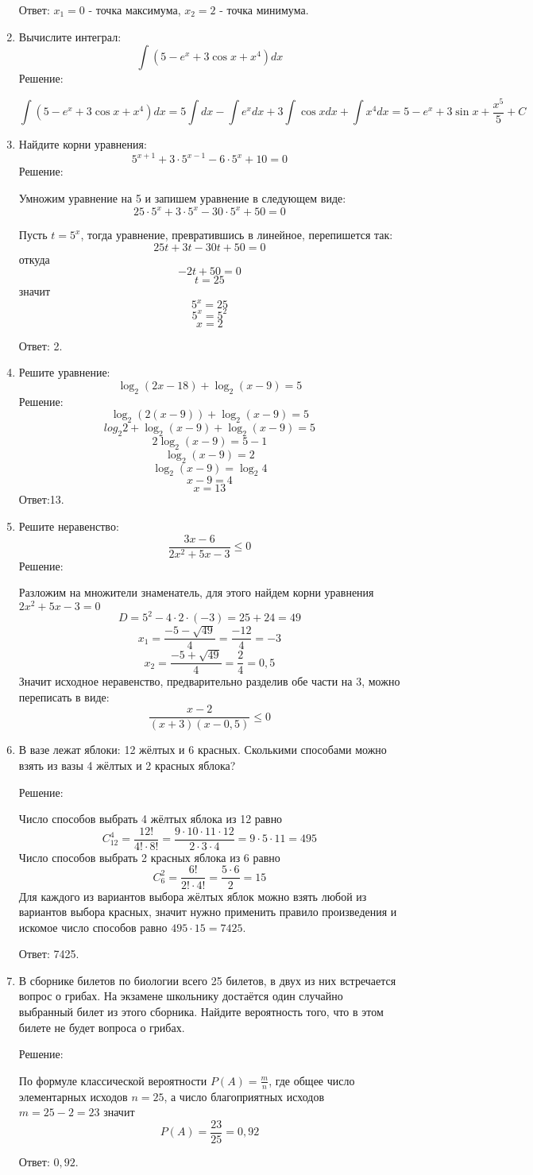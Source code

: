 \documentclass{article}
\renewcommand{\le}{\ensuremath{\leqslant}}
\begin{document}
\begin{enumerate}
Ответ: $x_1=0$ - точка максимума, $x_2=2$ - точка минимума.

\item %
Вычислите интеграл:
$$\int{\left(5-e^x+3\cos{x}+x^4\right)dx}$$
Решение:

$$\int{\left(5-e^x+3\cos{x}+x^4\right)dx}=5\int{dx}-\int{e^x dx}+3\int{\cos{x}dx}+\int{x^4dx}=5-e^x+3\sin{x}+\frac{x^5}{5}+C$$

\item %
Найдите корни уравнения:
$$5^{x+1}+3\cdot5^{x-1}-6\cdot5^x+10=0$$
Решение:

Умножим уравнение на 5 и запишем уравнение в следующем виде: $$25\cdot5^x+3\cdot5^x-30\cdot5^x+50=0$$

Пусть $t=5^x$, тогда уравнение, превратившись в линейное, перепишется так: $$25t+3t-30t+50=0$$ откуда $$-2t+50=0$$ $$t=25$$ значит $$5^x=25$$ $$5^x=5^2$$ $$x=2$$

Ответ: 2.

\item %
Решите уравнение:
$$\log_2{(2x-18)}+\log_2{(x-9)}=5$$
Решение:
$$\log_2{(2(x-9))}+\log_2{(x-9)}=5$$
$$log_2{2}+\log_2{(x-9)}+\log_2{(x-9)}=5$$
$$2\log_2{(x-9)}=5-1$$
$$\log_2{(x-9)}=2$$
$$\log_2{(x-9)}=\log_2{4}$$
$$x-9=4$$
$$x=13$$
Ответ:13.

\item %
Решите неравенство:
$$\frac{3x-6}{2x^2+5x-3}\le0$$
Решение:

Разложим на множители знаменатель, для этого найдем корни уравнения $2x^2+5x-3=0$ $$D=5^2-4\cdot2\cdot(-3)=25+24=49$$ $$x_1=\frac{-5-\sqrt{49}}{4}=\frac{-12}{4}=-3$$ $$x_2=\frac{-5+\sqrt{49}}{4}=\frac{2}{4}=0,5$$
Значит исходное неравенство, предварительно разделив обе части на 3, можно переписать в виде:
$$\frac{x-2}{(x+3)(x-0,5)}\le0$$
\item %
В вазе лежат яблоки: 12 жёлтых и 6 красных. Сколькими способами можно взять из вазы 4 жёлтых и 2 красных яблока?

Решение:

Число способов выбрать 4 жёлтых яблока из 12 равно $$C_{12}^4=\frac{12!}{4!\cdot8!}=\frac{9\cdot10\cdot11\cdot12}{2\cdot3\cdot4}=9\cdot5\cdot11=495$$
Число способов выбрать 2 красных яблока из 6 равно
$$C_{6}^2=\frac{6!}{2!\cdot4!}=\frac{5\cdot6}{2}=15$$
Для каждого из вариантов выбора жёлтых яблок можно взять любой из вариантов выбора красных, значит нужно применить правило произведения и искомое число способов равно $495\cdot15=7425$.

Ответ: 7425.

\item %
В сборнике билетов по биологии всего 25 билетов, в двух из них встречается вопрос о грибах. На экзамене школьнику достаётся один случайно выбранный билет из этого сборника. Найдите вероятность того, что в этом билете не будет вопроса о грибах.

Решение:

По формуле классической вероятности $P(A)=\frac{m}{n}$, где общее число элементарных исходов $n=25$, а число благоприятных исходов $m=25-2=23$ значит $$P(A)=\frac{23}{25}=0,92$$

Ответ: $0,92$.

\end{enumerate}
\end{document}
